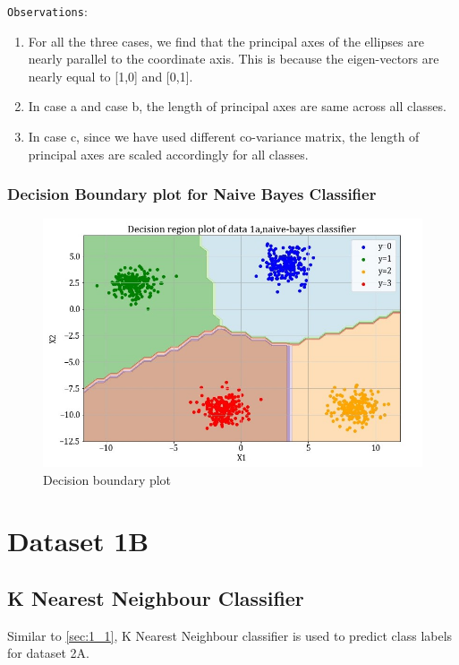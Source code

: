 \documentclass[11pt,a4paper]{article}
\newcommand{\noi}{\noindent}
\def\tt#1{\texttt{#1}}
\begin{document}
\noi
\tt{Observations}: 
\begin{enumerate}
    \item For all the three cases, we find that the principal axes of the ellipses are nearly parallel to the coordinate axis. This is because the eigen-vectors are nearly equal to [1,0] and [0,1].
    \item In case a and case b, the length of principal axes are same across all classes. 
    \item In case c, since we have used different co-variance matrix, the length of principal axes are scaled accordingly for all classes.
\end{enumerate}

\subsubsection{Decision Boundary plot for Naive Bayes Classifier}

\begin{figure}[H]
    \centering
    \includegraphics[scale=0.5]{images/1A_nb_case1_decisionregion.jpg}
    \caption{Decision boundary plot}
    \label{fig:db1}
\end{figure}

\noi

\break
\section{Dataset 1B}
\subsection{K Nearest Neighbour Classifier} 

Similar to \autoref{sec:1_1}, K Nearest Neighbour classifier is used to predict class labels for dataset 2A. \\
\end{document}
